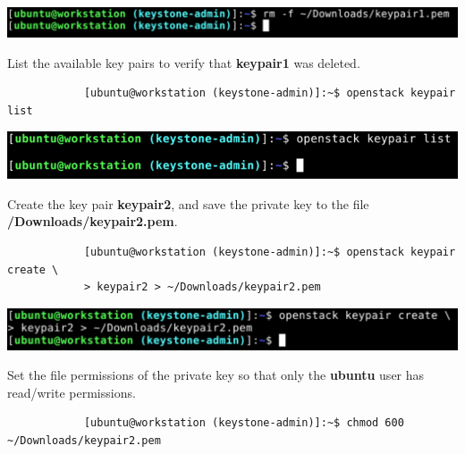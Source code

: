 \documentclass[letterpaper, 12pt]{article}
\begin{document}
\begin{enumerate}
\begin{labstep}
        \begin{center}
            \includegraphics[width=\linewidth]{images/part3/step8.png}
        \end{center}
    \end{labstep}

    \begin{labstep}
        List the available key pairs to verify that \textbf{keypair1} was deleted.
        \begin{lstlisting}
            [ubuntu@workstation (keystone-admin)]:~$ openstack keypair list
        \end{lstlisting}

        \begin{center}
            \includegraphics[width=\linewidth]{images/part3/step9.png}
        \end{center}
    \end{labstep}

    \begin{labstep}
        Create the key pair \textbf{keypair2}, and save the private key to the file
        \textbf{\texttildemid/Downloads/keypair2.pem}.
        \begin{lstlisting}
            [ubuntu@workstation (keystone-admin)]:~$ openstack keypair create \
            > keypair2 > ~/Downloads/keypair2.pem
        \end{lstlisting}

        \begin{center}
            \includegraphics[width=\linewidth]{images/part3/step10.png}
        \end{center}
    \end{labstep}

    \begin{labstep}
        Set the file permissions of the private key so that only the \textbf{ubuntu} user has read/write permissions.
        \begin{lstlisting}
            [ubuntu@workstation (keystone-admin)]:~$ chmod 600 ~/Downloads/keypair2.pem
        \end{lstlisting}


\end{labstep}
\end{enumerate}
\end{document}
